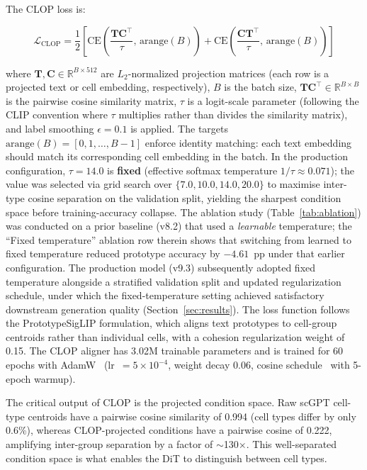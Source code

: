 \documentclass[biology,article,submit,pdftex,moreauthors]{Definitions/mdpi}
\begin{document}
The CLOP loss is:

\begin{linenomath}
\begin{equation}
\mathcal{L}_\text{CLOP} = \frac{1}{2}\left[\text{CE}\!\left(\frac{\mathbf{T}\mathbf{C}^\top}{\tau},\,\text{arange}(B)\right) + \text{CE}\!\left(\frac{\mathbf{C}\mathbf{T}^\top}{\tau},\,\text{arange}(B)\right)\right]
\label{eq:clop}
\end{equation}
\end{linenomath}

where $\mathbf{T}, \mathbf{C} \in \mathbb{R}^{B \times 512}$ are $L_2$-normalized projection matrices (each row is a projected text or cell embedding, respectively), $B$ is the batch size, $\mathbf{T}\mathbf{C}^\top \in \mathbb{R}^{B \times B}$ is the pairwise cosine similarity matrix, $\tau$ is a logit-scale parameter (following the CLIP convention where $\tau$ multiplies rather than divides the similarity matrix), and label smoothing $\epsilon = 0.1$ is applied. The targets $\text{arange}(B) = [0, 1, \ldots, B{-}1]$ enforce identity matching: each text embedding should match its corresponding cell embedding in the batch. In the production configuration, $\tau = 14.0$ is \textbf{fixed} (effective softmax temperature $1/\tau \approx 0.071$); the value was selected via grid search over $\{7.0, 10.0, 14.0, 20.0\}$ to maximise inter-type cosine separation on the validation split, yielding the sharpest condition space before training-accuracy collapse. The ablation study (Table~\ref{tab:ablation}) was conducted on a prior baseline (v8.2) that used a \emph{learnable} temperature; the ``Fixed temperature'' ablation row therein shows that switching from learned to fixed temperature reduced prototype accuracy by $-4.61$~pp under that earlier configuration. The production model (v9.3) subsequently adopted fixed temperature alongside a stratified validation split and updated regularization schedule, under which the fixed-temperature setting achieved satisfactory downstream generation quality (Section~\ref{sec:results}). The loss function follows the PrototypeSigLIP formulation, which aligns text prototypes to cell-group centroids rather than individual cells, with a cohesion regularization weight of 0.15. The CLOP aligner has 3.02M trainable parameters and is trained for 60 epochs with AdamW~\cite{ref-adamw} (lr~$= 5 \times 10^{-4}$, weight decay 0.06, cosine schedule~\cite{ref-cosine-schedule} with 5-epoch warmup).

The critical output of CLOP is the projected condition space. Raw scGPT cell-type centroids have a pairwise cosine similarity of 0.994 (cell types differ by only 0.6\%), whereas CLOP-projected conditions have a pairwise cosine of 0.222, amplifying inter-group separation by a factor of $\sim$130$\times$. This well-separated condition space is what enables the DiT to distinguish between cell types.
\end{document}
